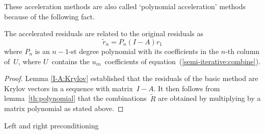 \documentclass[11pt]{artikel3}
\begin{document}
\begin{Outline}
These acceleration methods are also called `polynomial acceleration'
methods because of the following fact.

\begin{lemma}
The accelerated residuals are related to the original residuals as
\[ \tilde r_n=P_n(I-A)r_1 \] where $P_n$ is an $n-1$-st degree
polynomial with its coefficients in the $n$-th column of~$U$, where
$U$~contains the $u_{in}$~coefficients of
equation~(\ref{semi-iterative:combine}).
\end{lemma}

\begin{proof} Lemma \ref{I-A:Krylov} established that the residuals
of the basic method
are Krylov vectors in a sequence with matrix~$I-A$. It then follows
from lemma~\ref{th:polynomial} that the combinations~$\tilde R$ are
obtained by multiplying by a matrix polynomial as stated above.
\end{proof}

 {Left and right preconditioning}
\label{sec:left-right-prec}
\FurtherReading

\begin{comment}
The proof of theorem~\ref{main-theorem} noted that all systems with
$A\inv f$ as solution can be written as~$MAx=Mf$. The matrix~$M$ is
commonly called the `left-preconditioner'\footnote{But note that the
residuals are in a Krylov space of the matrix~$AM$.}. 

A~right preconditioner can
be employed as follows. If $\bar x=A\inv f$, then a polynomial method
$X=\PmethodA{AN}$ is a method for~$N\inv x$, and we need to transform
the iterates --~which was not necessary in the case of a left
preconditioner~-- to obtain a method for the original system.

Specifically, we are interested in the sequence $NX=\{Nx_i\}_{i\geq
1}$. From lemma~\ref{BX-method} we already know that this is again a
polynomial method, so by theorem~\ref{main-theorem} above it can be
characterized by a single {\em left\/} preconditioner, but we will
derive this fact in a second way.

Consider any polynomial method for $N\inv A\inv f$,
and let residuals be defined by $R=ANX-fe^t$.
By theorem~\ref{main-theorem} above, we can compute iterates,
residuals, and search directions by
        \[ X(I-J)=PD,\qquad ANPD=R(I-J),\qquad MR=P(I-U). \]
Since $X$ is a method for $N\inv\bar x$, we introduce the sequences
        \[ \tilde X=NX,\qquad \tilde P=NP, \]
with which we get the method
        \[ \tilde X(I-J)=PD,\qquad A\tilde PD=R(I-J),\qquad
                NMR=\tilde P(I-U). \]
We see that the right preconditioner is simply aborbed as part of
the total preconditioner~$NM$.
Note also that $R=ANX-fe^t=A\tilde X-fe^t$, that is, the residuals of the
right preconditioned method are also the residuals of the sequence
for~$\bar x$.
\end{comment}


\end{Outline}
\end{document}
